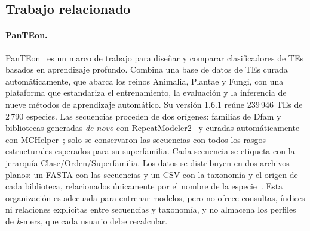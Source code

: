 \subsection*{Trabajo relacionado}

\paragraph{PanTEon.}
PanTEon~\cite{orozcoarias2026panteon} es un marco de trabajo para
diseñar y comparar clasificadores de TEs basados en aprendizaje
profundo. Combina una base de datos de TEs curada automáticamente, que
abarca los reinos Animalia, Plantae y Fungi, con una plataforma que
estandariza el entrenamiento, la evaluación y la inferencia de nueve
métodos de aprendizaje automático. Su versión 1.6.1 reúne 239\,946 TEs
de 2\,790 especies. Las secuencias proceden de dos orígenes: familias
de Dfam y bibliotecas generadas \textit{de novo} con
RepeatModeler2~\cite{flynn2020repeatmodeler2} y curadas
automáticamente con MCHelper~\cite{orozcoarias2024mchelper}; solo se
conservaron las secuencias con todos los rasgos estructurales esperados
para su superfamilia. Cada secuencia se etiqueta con la jerarquía
Clase/Orden/Superfamilia. Los datos se distribuyen en dos archivos
planos: un FASTA con las secuencias y un CSV con la taxonomía y el
origen de cada biblioteca, relacionados únicamente por el nombre de la
especie~\cite{panteon2026zenodo}. Esta organización es adecuada para
entrenar modelos, pero no ofrece consultas, índices ni relaciones
explícitas entre secuencias y taxonomía, y no almacena los perfiles de
\textit{k}-mers, que cada usuario debe recalcular.

